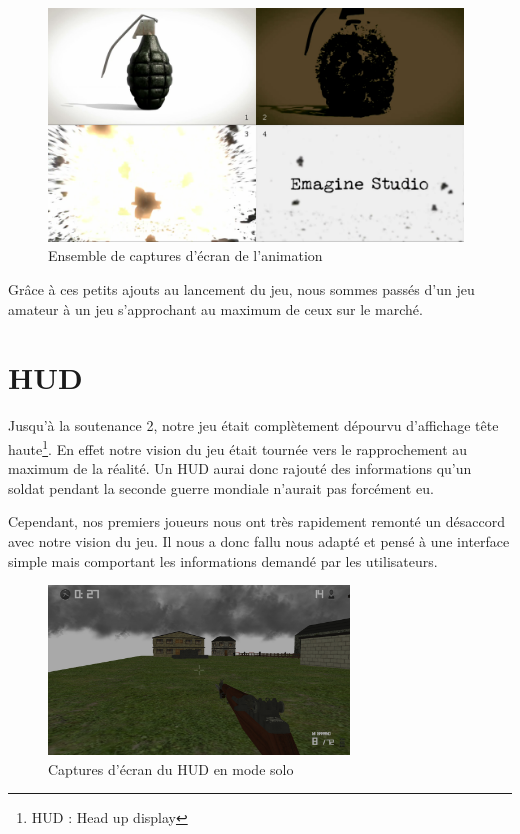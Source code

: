 \documentclass[11pt]{report}
\begin{document}
\begin{figure}[htbp]
\centering
\includegraphics[width=11cm]{anim-eie.png}
\caption{Ensemble de captures d'écran de l'animation}
\end{figure}

Grâce à ces petits ajouts au lancement du jeu, nous sommes passés d’un jeu amateur à un jeu s'approchant au maximum de ceux sur le marché.

\section{HUD}

Jusqu'à la soutenance 2, notre jeu était complètement dépourvu d'affichage tête haute\footnote{HUD : Head up display}. En effet notre vision du jeu était tournée vers le rapprochement au maximum de la réalité. Un HUD aurai donc rajouté des informations qu'un soldat pendant la seconde guerre mondiale n'aurait pas forcément eu.

Cependant, nos premiers joueurs nous ont très rapidement remonté un désaccord avec notre vision du jeu. Il nous a donc fallu nous adapté et pensé à une interface simple mais comportant les informations demandé par les utilisateurs.

\begin{figure}[htbp]
\centering
\includegraphics[width=8cm]{hud.png}
\caption{Captures d'écran du HUD en mode solo}
\label{hud}
\end{figure}
\end{document}
